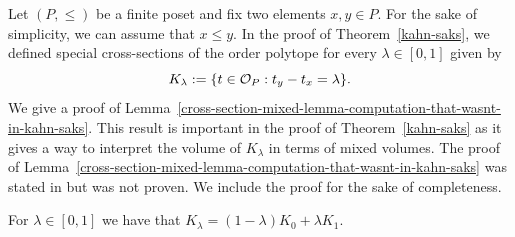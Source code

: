 \documentclass{puthesis-UG}
\begin{document}
Let $(P, \leq)$ be a finite poset and fix two elements $x, y \in P$. For the sake of simplicity, we can assume that $x \leq y$. In the proof of Theorem~\ref{kahn-saks}, we defined special cross-sections of the order polytope for every $\lambda \in [0, 1]$ given by
\[
	K_\lambda := \{t \in \mathcal{O}_P : t_y - t_x = \lambda\}.
\]
We give a proof of Lemma~\ref{cross-section-mixed-lemma-computation-that-wasnt-in-kahn-saks}. This result is important in the proof of Theorem~\ref{kahn-saks} as it gives a way to interpret the volume of $K_\lambda$ in terms of mixed volumes. The proof of Lemma~\ref{cross-section-mixed-lemma-computation-that-wasnt-in-kahn-saks} was stated in \cite{balancing-poset-extensions} but was not proven. We include the proof for the sake of completeness. 

\begin{lem} \label{cross-section-mixed-lemma-computation-that-wasnt-in-kahn-saks}
	For $\lambda \in [0, 1]$ we have that $K_\lambda = (1-\lambda) K_0 + \lambda K_1$. 
\end{lem}
\end{document}

